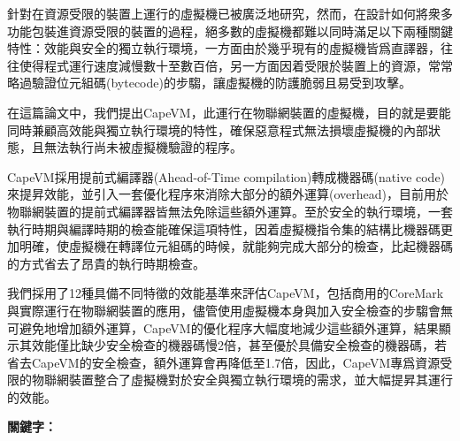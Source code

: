 \begin{abstractzh}
針對在資源受限的裝置上運行的虛擬機已被廣泛地研究，然而，在設計如何將衆多功能包裝進資源受限的裝置的過程，絕多數的虛擬機都難以同時滿足以下兩種關鍵特性：效能與安全的獨立執行環境，一方面由於幾乎現有的虛擬機皆爲直譯器，往往使得程式運行速度減慢數十至數百倍，另一方面因着受限於裝置上的資源，常常略過驗證位元組碼(bytecode)的步騶，讓虛擬機的防護脆弱且易受到攻擊。

在這篇論文中，我們提出CapeVM，此運行在物聯網裝置的虛擬機，目的就是要能同時兼顧高效能與獨立執行環境的特性，確保惡意程式無法損壞虛擬機的內部狀態，且無法執行尚未被虛擬機驗證的程序。

CapeVM採用提前式編譯器(Ahead-of-Time compilation)轉成機器碼(native code)來提昇效能，並引入一套優化程序來消除大部分的額外運算(overhead)，目前用於物聯網裝置的提前式編譯器皆無法免除這些額外運算。至於安全的執行環境，一套執行時期與編譯時期的檢查能確保這項特性，因着虛擬機指令集的結構比機器碼更加明確，使虛擬機在轉譯位元組碼的時候，就能夠完成大部分的檢查，比起機器碼的方式省去了昂貴的執行時期檢查。

我們採用了12種具備不同特徵的效能基準來評估CapeVM，包括商用的CoreMark與實際運行在物聯網裝置的應用，儘管使用虛擬機本身與加入安全檢查的步騶會無可避免地增加額外運算，CapeVM的優化程序大幅度地減少這些額外運算，結果顯示其效能僅比缺少安全檢查的機器碼慢2倍，甚至優於具備安全檢查的機器碼，若省去CapeVM的安全檢查，額外運算會再降低至1.7倍，因此，CapeVM專爲資源受限的物聯網裝置整合了虛擬機對於安全與獨立執行環境的需求，並大幅提昇其運行的效能。

\bigbreak
\noindent \textbf{關鍵字：}{\, \makeatletter \@keywordszh \makeatother}
\end{abstractzh}

